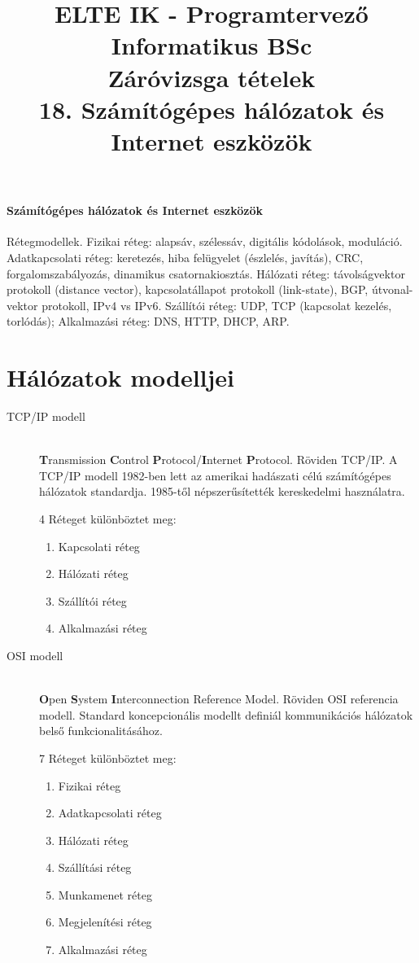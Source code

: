 \documentclass[margin=0px]{article}
\title{\textbf{{\Large ELTE IK - Programtervező Informatikus BSc} \vspace{0.2cm} \\ {\huge Záróvizsga tételek}} \vspace{0.3cm} \\ 18. Számítógépes hálózatok és Internet eszközök}
\author{}
\date{}
\newenvironment{tetel}[1]{\paragraph{#1 \\}}{}
\begin{document}
\maketitle

\begin{tetel}{Számítógépes hálózatok és Internet eszközök}
    Rétegmodellek. Fizikai réteg: alapsáv, szélessáv, digitális kódolások, moduláció. Adatkapcsolati réteg: keretezés, hiba felügyelet (észlelés, javítás), CRC, forgalomszabályozás, dinamikus csatornakiosztás. Hálózati réteg: távolságvektor protokoll (distance vector), kapcsolatállapot protokoll (link-state), BGP, útvonal-vektor protokoll, IPv4 vs IPv6. Szállítói réteg: UDP, TCP (kapcsolat kezelés, torlódás); Alkalmazási réteg: DNS, HTTP, DHCP, ARP.
\end{tetel}

\section{Hálózatok modelljei}
\begin{description}
    \item[TCP/IP modell]  \hfill \\
        \textbf{T}ransmission \textbf{C}ontrol \textbf{P}rotocol/\textbf{I}nternet \textbf{P}rotocol. Röviden TCP/IP. A TCP/IP modell 1982-ben lett az amerikai hadászati célú számítógépes hálózatok standardja. 1985-től népszerűsítették kereskedelmi használatra.

        4 Réteget különböztet meg:
        \begin{enumerate}
            \item Kapcsolati réteg
            \item Hálózati réteg
            \item Szállítói réteg
            \item Alkalmazási réteg
        \end{enumerate}
    \item[OSI modell]  \hfill \\
        \textbf{O}pen \textbf{S}ystem \textbf{I}nterconnection Reference Model. Röviden OSI referencia modell. Standard koncepcionális modellt definiál kommunikációs hálózatok belső funkcionalitásához.

        7 Réteget különböztet meg:
        \begin{enumerate}
            \item Fizikai réteg
            \item Adatkapcsolati réteg
            \item Hálózati réteg
            \item Szállítási réteg
            \item Munkamenet réteg
            \item Megjelenítési réteg
            \item Alkalmazási réteg
        \end{enumerate}
\end{description}
\end{document}
